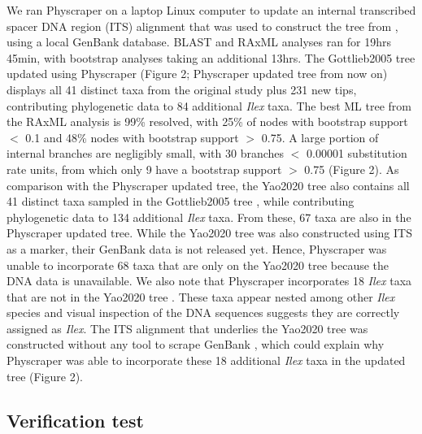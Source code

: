 \documentclass{bmcart}
\begin{document}
We ran Physcraper on a laptop Linux computer to update an internal transcribed
spacer DNA region (ITS) alignment that was used to construct the tree from \cite{gottlieb2005molecular},
using a local GenBank database.  BLAST and RAxML analyses ran for 19hrs 45min, with bootstrap
analyses taking an additional 13hrs.
The Gottlieb2005 tree \cite{gottlieb2005molecular} updated using Physcraper (Figure 2;
Physcraper updated tree from now on) displays all 41 distinct
taxa from the original study plus 231 new tips, contributing phylogenetic data to
84 additional \textit{Ilex} taxa. The best ML tree from the RAxML analysis is 99\%
resolved, with 25\% of nodes with bootstrap support $<$ 0.1 and 48\% nodes with
bootstrap support $>$ 0.75.
A large portion of internal branches are negligibly small, with 30 branches
$<$ 0.00001 substitution rate units, from which only 9 have a bootstrap support $>$ 0.75
(Figure 2).
As comparison with the Physcraper updated tree, the Yao2020 tree \cite{yao2020phylogeny}
also contains all 41 distinct taxa
sampled in the Gottlieb2005 tree \cite{gottlieb2005molecular},
while contributing phylogenetic data to 134 additional \textit{Ilex} taxa. From these,
67 taxa are also in the Physcraper updated tree.
While the Yao2020 tree \cite{yao2020phylogeny} was also constructed using
ITS as a marker, their GenBank data is not released yet. Hence, Physcraper was unable
to incorporate 68 taxa that are only on the Yao2020 tree because the DNA data is unavailable.
We also note that Physcraper incorporates 18 \textit{Ilex} taxa that are not in the Yao2020
tree \cite{yao2020phylogeny}. These taxa appear nested among other \textit{Ilex} species
and visual inspection of the DNA sequences suggests they are correctly assigned as \textit{Ilex}.
The ITS alignment that underlies the Yao2020 tree was constructed without any tool to
scrape GenBank \cite{yao2020phylogeny}, which could explain why Physcraper was able to
incorporate these 18 additional \textit{Ilex} taxa in the updated tree (Figure 2).


\subsection*{Verification test}
\end{document}
